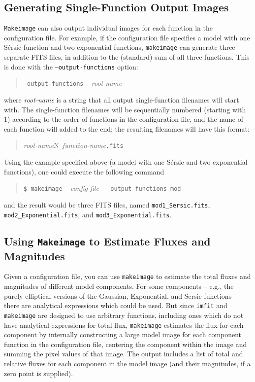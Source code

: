 \documentclass[10pt]{article}
\newcommand{\imfit}{\texttt{imfit}}
\newcommand{\makeimage}{\texttt{makeimage}}
\newcommand{\Makeimage}{\texttt{Makeimage}}
\begin{document}
\subsection{Generating Single-Function Output Images}

\Makeimage{} can also output individual images for each function
in the configuration file. For example, if the configuration file specifies
a model with one S\'ersic function and two exponential functions, \makeimage{}
can generate three separate FITS files, in addition to the (standard) sum of
all three functions.  This is done with the \texttt{--output-functions} option:
\begin{quote}
  \texttt{--output-functions} ~ \textit{root-name}
\end{quote}
where \textit{root-name} is a string that all output single-function filenames will
start with. The single-function filenames will be sequentially numbered (starting
with 1) according to the order of functions in the configuration file, and the
name of each function will added to the end; the resulting filenames will have
this format:
\begin{quote}
  \textit{root-name}{N}\texttt{\_}\textit{function-name}\texttt{.fits}
\end{quote}

Using the example specified above (a model with one S\'ersic and two exponential
functions), one could execute the following command
\begin{quote}
  \texttt{\$ \makeimage} ~ \textit{config-file} ~ \texttt{--output-functions mod}
\end{quote}
and the result would be three FITS files, named \texttt{mod1\_Sersic.fits},
\texttt{mod2\_Exponential.fits}, and \texttt{mod3\_Exponential.fits}.


\subsection{Using \Makeimage{} to Estimate Fluxes and Magnitudes}

Given a configuration file, you can use \makeimage{} to estimate the total
fluxes and magnitudes of different model components. For some components --
e.g., the purely elliptical versions of the Gaussian, Exponential, and Sersic
functions -- there are analytical expressions which could be used. But since
\imfit{} and \makeimage{} are designed to use arbitrary functions, including
ones which do not have analytical expressions for total flux, \makeimage{}
estimates the flux for each component by internally constructing a large model
image for each component function in the configuration file, centering the
component within the image and summing the pixel values of that image. The
output includes a list of total and relative fluxes for each component in the
model image (and their magnitudes, if a zero point is supplied).
\end{document}
